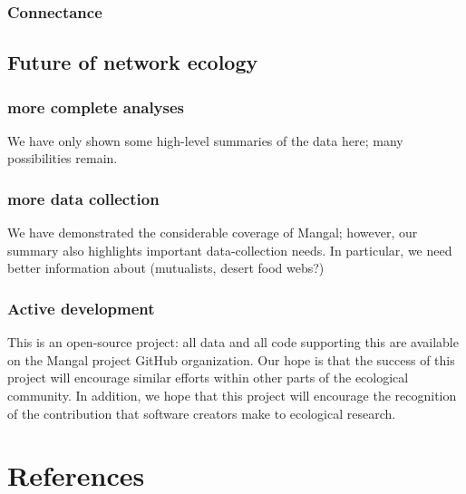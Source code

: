 \hypertarget{connectance}{%
\subsubsection{Connectance}\label{connectance}}

\hypertarget{future-of-network-ecology}{%
\subsection{Future of network ecology}\label{future-of-network-ecology}}

\hypertarget{more-complete-analyses}{%
\subsubsection{more complete analyses}\label{more-complete-analyses}}

We have only shown some high-level summaries of the data here; many
possibilities remain.

\hypertarget{more-data-collection}{%
\subsubsection{more data collection}\label{more-data-collection}}

We have demonstrated the considerable coverage of Mangal; however, our
summary also highlights important data-collection needs. In particular,
we need better information about (mutualists, desert food webs?)

\hypertarget{active-development}{%
\subsubsection{Active development}\label{active-development}}

This is an open-source project: all data and all code supporting this
are available on the Mangal project GitHub organization. Our hope is
that the success of this project will encourage similar efforts within
other parts of the ecological community. In addition, we hope that this
project will encourage the recognition of the contribution that software
creators make to ecological research.

\hypertarget{references}{%
\section{References}\label{references}}
